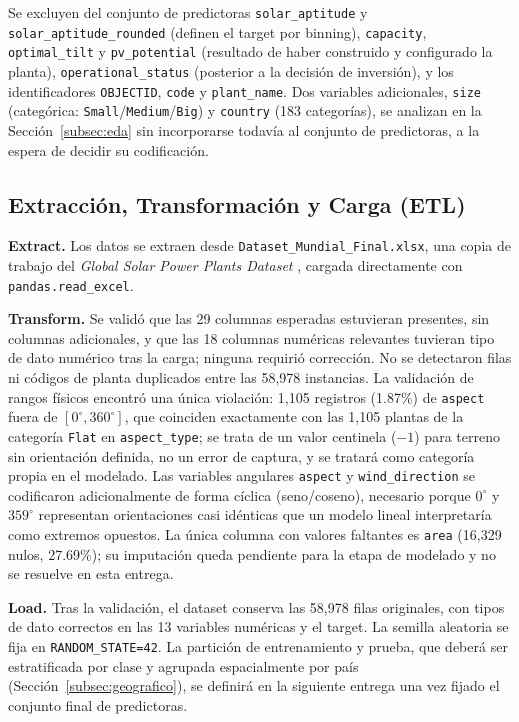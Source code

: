 \documentclass[pdflatex,sn-mathphys-num]{sn-jnl}
\begin{document}
Se excluyen del conjunto de predictoras \texttt{solar\_aptitude} y \texttt{solar\_aptitude\_rounded} (definen el target por binning), \texttt{capacity}, \texttt{optimal\_tilt} y \texttt{pv\_potential} (resultado de haber construido y configurado la planta), \texttt{operational\_status} (posterior a la decisión de inversión), y los identificadores \texttt{OBJECTID}, \texttt{code} y \texttt{plant\_name}. Dos variables adicionales, \texttt{size} (categórica: \texttt{Small}/\texttt{Medium}/\texttt{Big}) y \texttt{country} (183 categorías), se analizan en la Sección~\ref{subsec:eda} sin incorporarse todavía al conjunto de predictoras, a la espera de decidir su codificación.

\subsection{Extracción, Transformación y Carga (ETL)}\label{subsec:etl}

\textbf{Extract.} Los datos se extraen desde \texttt{Dataset\_Mundial\_Final.xlsx}, una copia de trabajo del \textit{Global Solar Power Plants Dataset} \cite{bib1}, cargada directamente con \texttt{pandas.read\_excel}.

\textbf{Transform.} Se validó que las 29 columnas esperadas estuvieran presentes, sin columnas adicionales, y que las 18 columnas numéricas relevantes tuvieran tipo de dato numérico tras la carga; ninguna requirió corrección. No se detectaron filas ni códigos de planta duplicados entre las 58{,}978 instancias. La validación de rangos físicos encontró una única violación: 1{,}105 registros (1.87\%) de \texttt{aspect} fuera de $[0^\circ, 360^\circ]$, que coinciden exactamente con las 1{,}105 plantas de la categoría \texttt{Flat} en \texttt{aspect\_type}; se trata de un valor centinela ($-1$) para terreno sin orientación definida, no un error de captura, y se tratará como categoría propia en el modelado. Las variables angulares \texttt{aspect} y \texttt{wind\_direction} se codificaron adicionalmente de forma cíclica (seno/coseno), necesario porque $0^\circ$ y $359^\circ$ representan orientaciones casi idénticas que un modelo lineal interpretaría como extremos opuestos. La única columna con valores faltantes es \texttt{area} (16{,}329 nulos, 27.69\%); su imputación queda pendiente para la etapa de modelado y no se resuelve en esta entrega.

\textbf{Load.} Tras la validación, el dataset conserva las 58{,}978 filas originales, con tipos de dato correctos en las 13 variables numéricas y el target. La semilla aleatoria se fija en \texttt{RANDOM\_STATE=42}. La partición de entrenamiento y prueba, que deberá ser estratificada por clase y agrupada espacialmente por país (Sección~\ref{subsec:geografico}), se definirá en la siguiente entrega una vez fijado el conjunto final de predictoras.
\end{document}
